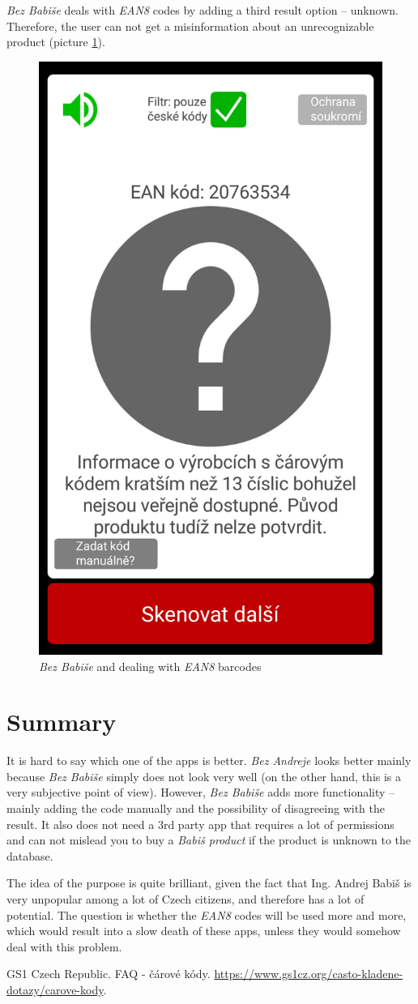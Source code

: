 \documentclass[12pt]{article} %
\begin{document}
\textit{Bez Babiše} deals with \textit{EAN8} codes by adding a third result option – unknown. Therefore, the user can not get a misinformation about an unrecognizable product (picture \ref{fig:bezbabise_unk}).

\begin{figure}[h]
	\centering
	\includegraphics[width=0.25\linewidth]{bez_babise_unk.jpg}
	\caption{\textit{Bez Babiše} and dealing with \textit{EAN8} barcodes}
	\label{fig:bezbabise_unk}
\end{figure}

\section{Summary}
It is hard to say which one of the apps is better. \textit{Bez Andreje} looks better mainly because \textit{Bez Babiše} simply does not look very well (on the other hand, this is a very subjective point of view). However, \textit{Bez Babiše} adds more functionality – mainly adding the code manually and the possibility of disagreeing with the result. It also does not need a 3rd party app that requires a lot of permissions and can not mislead you to buy a \textit{Babiš product} if the product is unknown to the database.

The idea of the purpose is quite brilliant, given the fact that Ing. Andrej Babiš is very unpopular among a lot of Czech citizens, and therefore has a lot of potential. The question is whether the \textit{EAN8} codes will be used more and more, which would result into a slow death of these apps, unless they would somehow deal with this problem.




\begin{thebibliography}{99} %

GS1 Czech Republic.
\newblock FAQ - čárové kódy.
\newblock \url{https://www.gs1cz.org/casto-kladene-dotazy/carove-kody}.
 
\end{thebibliography}

\end{document}
